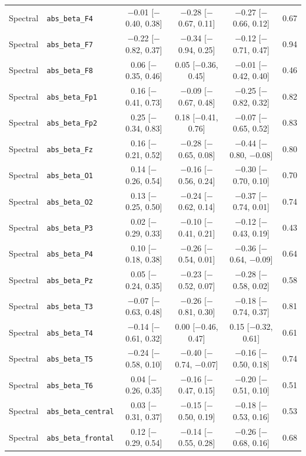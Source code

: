 {\begin{longtable}{llcccc}
Spectral & \texttt{abs\_beta\_F4} & $-$0.01 [$-$0.40, 0.38] & $-$0.28 [$-$0.67, 0.11] & $-$0.27 [$-$0.66, 0.12] & 0.67 \\
Spectral & \texttt{abs\_beta\_F7} & $-$0.22 [$-$0.82, 0.37] & $-$0.34 [$-$0.94, 0.25] & $-$0.12 [$-$0.71, 0.47] & 0.94 \\
Spectral & \texttt{abs\_beta\_F8} & 0.06 [$-$0.35, 0.46] & 0.05 [$-$0.36, 0.45] & $-$0.01 [$-$0.42, 0.40] & 0.46 \\
Spectral & \texttt{abs\_beta\_Fp1} & 0.16 [$-$0.41, 0.73] & $-$0.09 [$-$0.67, 0.48] & $-$0.25 [$-$0.82, 0.32] & 0.82 \\
Spectral & \texttt{abs\_beta\_Fp2} & 0.25 [$-$0.34, 0.83] & 0.18 [$-$0.41, 0.76] & $-$0.07 [$-$0.65, 0.52] & 0.83 \\
Spectral & \texttt{abs\_beta\_Fz} & 0.16 [$-$0.21, 0.52] & $-$0.28 [$-$0.65, 0.08] & $-$0.44 [$-$0.80, $-$0.08] & 0.80 \\
Spectral & \texttt{abs\_beta\_O1} & 0.14 [$-$0.26, 0.54] & $-$0.16 [$-$0.56, 0.24] & $-$0.30 [$-$0.70, 0.10] & 0.70 \\
Spectral & \texttt{abs\_beta\_O2} & 0.13 [$-$0.25, 0.50] & $-$0.24 [$-$0.62, 0.14] & $-$0.37 [$-$0.74, 0.01] & 0.74 \\
Spectral & \texttt{abs\_beta\_P3} & 0.02 [$-$0.29, 0.33] & $-$0.10 [$-$0.41, 0.21] & $-$0.12 [$-$0.43, 0.19] & 0.43 \\
Spectral & \texttt{abs\_beta\_P4} & 0.10 [$-$0.18, 0.38] & $-$0.26 [$-$0.54, 0.01] & $-$0.36 [$-$0.64, $-$0.09] & 0.64 \\
Spectral & \texttt{abs\_beta\_Pz} & 0.05 [$-$0.24, 0.35] & $-$0.23 [$-$0.52, 0.07] & $-$0.28 [$-$0.58, 0.02] & 0.58 \\
Spectral & \texttt{abs\_beta\_T3} & $-$0.07 [$-$0.63, 0.48] & $-$0.26 [$-$0.81, 0.30] & $-$0.18 [$-$0.74, 0.37] & 0.81 \\
Spectral & \texttt{abs\_beta\_T4} & $-$0.14 [$-$0.61, 0.32] & 0.00 [$-$0.46, 0.47] & 0.15 [$-$0.32, 0.61] & 0.61 \\
Spectral & \texttt{abs\_beta\_T5} & $-$0.24 [$-$0.58, 0.10] & $-$0.40 [$-$0.74, $-$0.07] & $-$0.16 [$-$0.50, 0.18] & 0.74 \\
Spectral & \texttt{abs\_beta\_T6} & 0.04 [$-$0.26, 0.35] & $-$0.16 [$-$0.47, 0.15] & $-$0.20 [$-$0.51, 0.10] & 0.51 \\
Spectral & \texttt{abs\_beta\_central} & 0.03 [$-$0.31, 0.37] & $-$0.15 [$-$0.50, 0.19] & $-$0.18 [$-$0.53, 0.16] & 0.53 \\
Spectral & \texttt{abs\_beta\_frontal} & 0.12 [$-$0.29, 0.54] & $-$0.14 [$-$0.55, 0.28] & $-$0.26 [$-$0.68, 0.16] & 0.68 \\

\end{longtable}}
